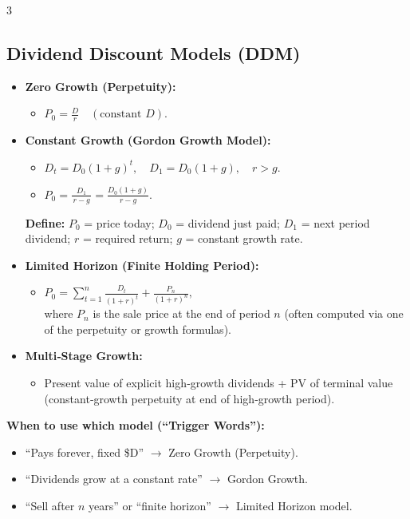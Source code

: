 \documentclass[10pt,landscape,fleqn]{article}
\begin{document}
\begin{multicols}{3}
\subsection*{Dividend Discount Models (DDM)}
\begin{itemize}
  \item \textbf{Zero Growth (Perpetuity):} 
    \begin{itemize}
      \item $P_0 = \frac{D}{r} \quad (\text{constant }D).$
    \end{itemize}
  \item \textbf{Constant Growth (Gordon Growth Model):} 
    \begin{itemize}
      \item $D_{t} = D_0(1+g)^t, \quad D_1 = D_0(1+g), \quad r > g.$
      \item $P_0 = \frac{D_1}{\,r - g\,} = \frac{D_0(1+g)}{\,r - g\,}.$
    \end{itemize}
    \textbf{Define:} $P_0$ = price today; $D_0$ = dividend just paid; $D_1$ = next period dividend; $r$ = required return; $g$ = constant growth rate.
  \item \textbf{Limited Horizon (Finite Holding Period):} 
    \begin{itemize}
      \item $P_0 = \sum_{t=1}^{n} \frac{D_t}{(1+r)^t} + \frac{P_n}{(1+r)^n},$ \\
        where $P_n$ is the sale price at the end of period $n$ (often computed via one of the perpetuity or growth formulas).
    \end{itemize}
  \item \textbf{Multi‐Stage Growth:} 
    \begin{itemize}
      \item Present value of explicit high‐growth dividends + PV of terminal value (constant‐growth perpetuity at end of high‐growth period).
    \end{itemize}
\end{itemize}

\textbf{When to use which model (“Trigger Words”):}
\begin{itemize}
  \item “Pays forever, fixed \$D” $\to$ Zero Growth (Perpetuity).
  \item “Dividends grow at a constant rate” $\to$ Gordon Growth.
  \item “Sell after $n$ years” or “finite horizon” $\to$ Limited Horizon model.
\end{itemize}


\end{multicols}
\end{document}
